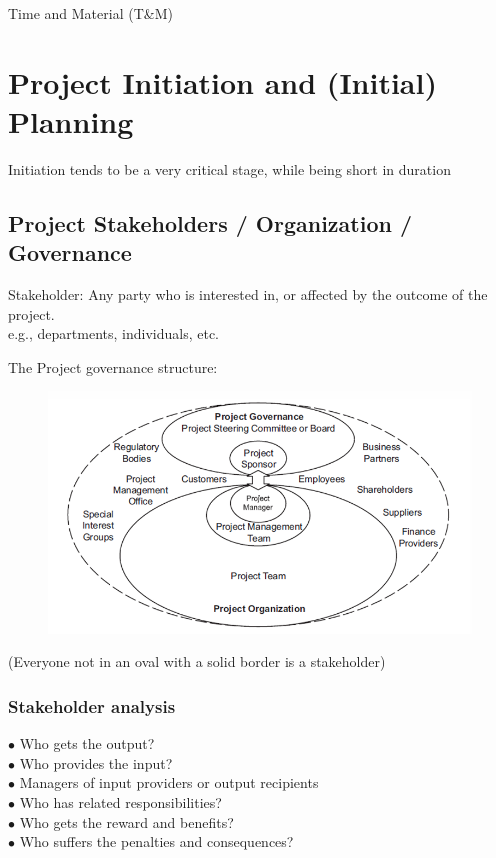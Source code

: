 \documentclass[]{project_plan}
\newcommand{\bulletPoint}{\hspace{-3.1pt}$\bullet$ \hspace{5pt}}
\begin{document}
Time and Material (T\&M)

\chapter{Project Initiation and (Initial) Planning}
Initiation tends to be a very critical stage, while being short in duration

\section{Project Stakeholders / Organization / Governance}
Stakeholder: Any party who is interested in, or affected by the outcome of the project.\\
e.g., departments, individuals, etc.

The Project governance structure:
\begin{figure}[h!]
  \centering
  \includegraphics[width=\linewidth]{project_governance_structure.png}
\end{figure}

(Everyone not in an oval with a solid border is a stakeholder)

\subsection{Stakeholder analysis}
\bulletPoint Who gets the output?\\
\bulletPoint  Who provides the input?\\
\bulletPoint  Managers of input providers or output recipients\\
\bulletPoint  Who has related responsibilities?\\
\bulletPoint  Who gets the reward and benefits?\\
\bulletPoint  Who suffers the penalties and consequences?
\end{document}
